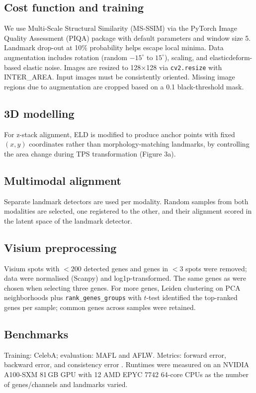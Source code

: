 \documentclass[11pt]{article}
\begin{document}
\subsection{Cost function and training}
We use Multi-Scale Structural Similarity (MS-SSIM) \citep{r19} via the PyTorch Image Quality Assessment (PIQA) package with default parameters and window size 5. Landmark drop-out at 10\% probability helps escape local minima. Data augmentation includes rotation (random $-15^\circ$ to $15^\circ$), scaling, and elasticdeform-based elastic noise. Images are resized to 128$\times$128 via \texttt{cv2.resize} with INTER\_AREA. Input images must be consistently oriented. Missing image regions due to augmentation are cropped based on a 0.1 black-threshold mask.

\subsection{3D modelling}
For z-stack alignment, ELD is modified to produce anchor points with fixed $(x,y)$ coordinates rather than morphology-matching landmarks, by controlling the area change during TPS transformation (Figure 3a).

\subsection{Multimodal alignment}
Separate landmark detectors are used per modality. Random samples from both modalities are selected, one registered to the other, and their alignment scored in the latent space of the landmark detector.

\subsection{Visium preprocessing}
Visium spots with $<200$ detected genes and genes in $<3$ spots were removed; data were normalised (Scanpy) and log1p-transformed. The same genes as \citep{r13} were chosen when selecting three genes. For more genes, Leiden clustering on PCA neighborhoods plus \texttt{rank\_genes\_groups} with $t$-test identified the top-ranked genes per sample; common genes across samples were retained.

\subsection{Benchmarks}
Training: CelebA; evaluation: MAFL and AFLW. Metrics: forward error, backward error, and consistency error \citep{r8}. Runtimes were measured on an NVIDIA A100-SXM 81\,GB GPU with 12 AMD EPYC 7742 64-core CPUs as the number of genes/channels and landmarks varied.
\end{document}
